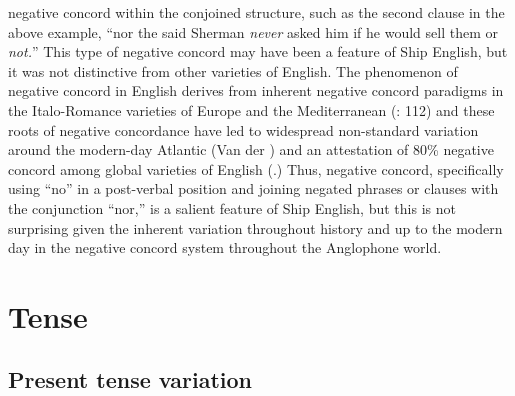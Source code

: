 negative concord within the conjoined structure, such as the second clause in the above example, “nor the said Sherman \textit{never} asked him if he would sell them or \textit{not.}” This type of negative concord may have been a feature of Ship English, but it was not distinctive from other varieties of English. The phenomenon of negative concord in English derives from inherent negative concord paradigms in the Italo-Romance varieties of Europe and the Mediterranean (\citealt{WillisEtAl2013}: 112) and these roots of negative concordance have led to widespread non-standard variation around the modern-day Atlantic (Van der \citealt{Auwera2016}) and an attestation of 80\% negative concord among global varieties of English (\citealt{KortmannLunkenheimer2013}.) Thus, negative concord, specifically using “no” in a post-verbal position and joining negated phrases or clauses with the conjunction “nor,” is a salient feature of Ship English, but this is not surprising given the inherent variation throughout history and up to the modern day in the negative concord system throughout the Anglophone world.  

\section{{Tense}}%

\subsection{{Present} {tense} {variation} }%


